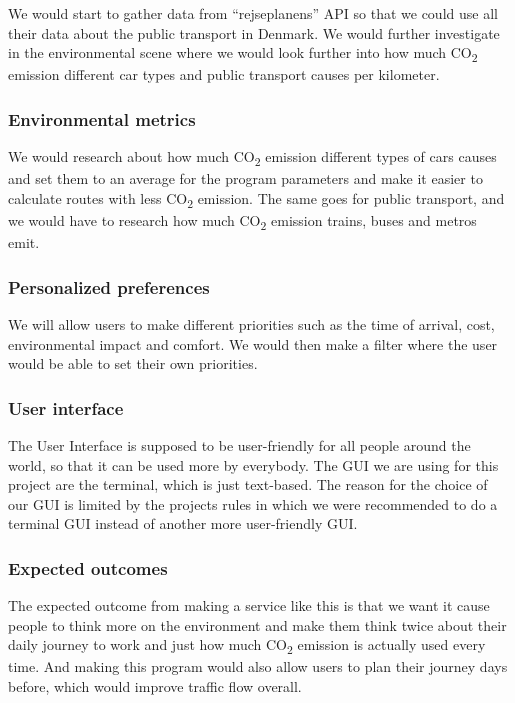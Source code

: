 We would start to gather data from ``rejseplanens'' API so that we could use all their data about the public transport
in Denmark.
We would further investigate in the environmental scene where we would look further into how much \unit{CO_{2}} emission
different car types and public transport causes per kilometer.

\subsubsection{Environmental metrics}

We would research about how much \unit{CO_{2}} emission different types of cars causes and set them to an average for
the program parameters and make it easier to calculate routes with less \unit{CO_{2}} emission.
The same goes for public transport, and we would have to research how much \unit{CO_{2}} emission trains, buses and
metros emit.

\subsubsection{Personalized preferences}

We will allow users to make different priorities such as the time of arrival, cost, environmental impact and comfort.
We would then make a filter where the user would be able to set their own priorities.

\subsubsection{User interface}

The User Interface is supposed to be user-friendly for all people around the world, so that it can be used more by
everybody.
The GUI we are using for this project are the terminal, which is just text-based.
The reason for the choice of our GUI is limited by the projects rules in which we were recommended to do a terminal GUI
instead of another more user-friendly GUI\@.

\subsubsection{Expected outcomes}

The expected outcome from making a service like this is that we want it cause people to think more on the environment
and make them think twice about their daily journey to work and just how much \unit{CO_{2}} emission is actually used
every time.
And making this program would also allow users to plan their journey days before, which would improve traffic flow
overall.
